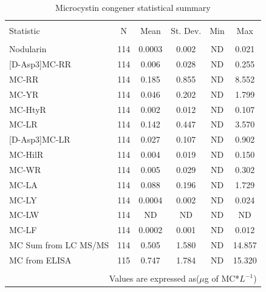 \begin{table}[!ht]
\centering
  \caption{Microcystin congener statistical summary}
  \label{}
\begin{tabular}{@{\extracolsep{5pt}}lccccc}
\\[-1.8ex]\hline
\hline \\[-1.8ex]
Statistic & \multicolumn{1}{c}{N} & \multicolumn{1}{c}{Mean} & \multicolumn{1}{c}{St. Dev.} & \multicolumn{1}{c}{Min} & \multicolumn{1}{c}{Max} \\
\hline \\[-1.8ex]
Nodularin & 114 & 0.0003 & 0.002 & ND & 0.021 \\
{[D-Asp3]}MC-RR & 114 & 0.006 & 0.028 & ND & 0.255 \\
MC-RR & 114 & 0.185 & 0.855 & ND & 8.552 \\
MC-YR & 114 & 0.046 & 0.202 & ND & 1.799 \\
MC-HtyR & 114 & 0.002 & 0.012 & ND & 0.107 \\
MC-LR & 114 & 0.142 & 0.447 & ND & 3.570 \\
{[D-Asp3]}MC-LR & 114 & 0.027 & 0.107 & ND & 0.902 \\
MC-HilR & 114 & 0.004 & 0.019 & ND & 0.150 \\
MC-WR & 114 & 0.005 & 0.029 & ND & 0.302 \\
MC-LA & 114 & 0.088 & 0.196 & ND & 1.729 \\
MC-LY & 114 & 0.0004 & 0.002 & ND & 0.024 \\
MC-LW & 114 & ND & ND & ND & ND \\
MC-LF & 114 & 0.0002 & 0.001 & ND & 0.012 \\
MC Sum from LC MS/MS  & 114 & 0.505 & 1.580 & ND & 14.857 \\
MC from ELISA & 115 & 0.747 & 1.784 & ND & 15.320 \\
\hline \\[-1.8ex]
\multicolumn{6}{r}{Values are expressed as($\mu$g of MC*${L^{-1}}$)} \\
\end{tabular}
\end{table}



